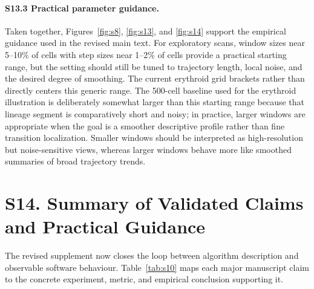 \documentclass[11pt]{article}
\begin{document}
\paragraph{S13.3 Practical parameter guidance.}
Taken together, Figures~\ref{fig:s8}, \ref{fig:s13}, and \ref{fig:s14} support the empirical guidance used in the revised main text. For exploratory scans, window sizes near 5--10\% of cells with step sizes near 1--2\% of cells provide a practical starting range, but the setting should still be tuned to trajectory length, local noise, and the desired degree of smoothing. The current erythroid grid brackets rather than directly centers this generic range. The 500-cell baseline used for the erythroid illustration is deliberately somewhat larger than this starting range because that lineage segment is comparatively short and noisy; in practice, larger windows are appropriate when the goal is a smoother descriptive profile rather than fine transition localization. Smaller windows should be interpreted as high-resolution but noise-sensitive views, whereas larger windows behave more like smoothed summaries of broad trajectory trends.

\section*{S14. Summary of Validated Claims and Practical Guidance}

The revised supplement now closes the loop between algorithm description and observable software behaviour. Table~\ref{tab:s10} maps each major manuscript claim to the concrete experiment, metric, and empirical conclusion supporting it.
\end{document}
